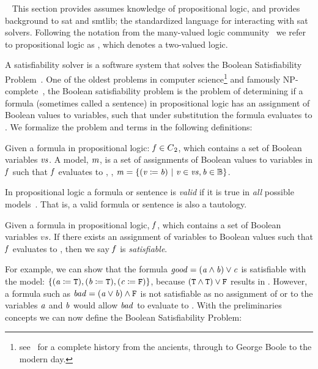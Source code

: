 ~\label{section:sat-solving}
%
This section provides assumes knowledge of propositional logic, and provides
background to \acl{sat} and \ac{smtlib}; the standardized language for
interacting with \ac{sat} solvers. Following the notation from the many-valued
logic community~\cite{Rescher1969-RESML} we refer to propositional logic as
\pl{}, which denotes a two-valued logic.

A satisfiability solver is a software system that solves the Boolean
Satisfiability Problem~\cite{russelNorvig}. One of the oldest problems in
computer science\footnote{see~\citet{BBH+09} for a complete history from the
  ancients, through to George Boole to the modern day.} and famously
NP-complete~\cite{10.1145/800157.805047}, the Boolean satisfiability problem is
the problem of determining if a formula (sometimes called a sentence) in
propositional logic has an assignment of Boolean values to variables, such that
under substitution the formula evaluates to \tru{}. We formalize the problem and
terms in the following definitions:

\begin{definition}[Model]
  Given a formula in propositional logic: $\mathit{f} \in {C\textsubscript{2}}{}$, which contains a
  set of Boolean variables $\mathit{vs}$. A model, $\mathit{m}$, is a set of assignments
  of Boolean values to variables in $\mathit{f}$ such that $\mathit{f}$ evaluates to
  \tru{}, \ie{}, $\mathit{m = \{ (v \coloneqq{} b)\ |\ v \in vs, b \in \mathbb{B}} \}$.
\end{definition}

\begin{corollary}[Validity]
  In propositional logic a formula or
  sentence is \emph{valid} if it is true in \emph{all} possible
  models~\cite{russelNorvig}. That is, a valid formula or sentence is also a
  tautology.
\end{corollary}

\begin{definition}[Satisfiable]
  Given a formula in propositional logic, $\mathit{f}$, which contains a set of
  Boolean variables $vs$. If there exists an assignment of variables to Boolean
  values such that $\mathit{f}$ evaluates to \tru{}, then we say $\mathit{f}$ is
  \emph{satisfiable}.
\end{definition}

For example, we can show that the formula $\mathit{good = (a \wedge b) \vee c}$ is
satisfiable with the model: $\{\mathit{(a \coloneqq{}{} \texttt{T}{}), (b \coloneqq{}{} \texttt{T}{}),
  (c \coloneqq{}{} \texttt{F}{})}\}$, because $(\texttt{T}{} \wedge{} \texttt{T}{}) \vee{} \texttt{F}{}$
results in \tru{}. However, a formula such as $\mathit{bad = (a \vee b) \wedge
  \texttt{F}{}}$ is not satisfiable as no assignment of \fls{} or \tru{} to the
variables $\mathit{a}$ and $\mathit{b}$ would allow $\mathit{bad}$ to evaluate to \tru{}.
With the preliminaries concepts we can now define the Boolean Satisfiability
Problem:

